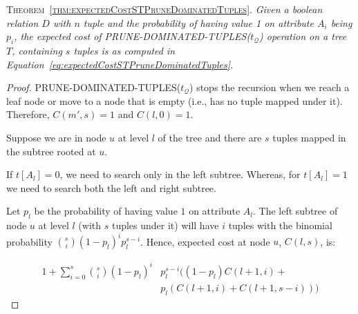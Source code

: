 \textsc{Theorem~\ref{thm:expectedCostSTPruneDominatedTuples}.} {\em
Given a boolean relation $D$ with $n$ tuple and the probability of having value 1 on attribute $A_i$ being $p_i$, the expected cost of PRUNE-DOMINATED-TUPLES($t_\mathcal{Q}$) operation on a tree $T$, containing $s$ tuples is as computed in Equation~\ref{eq:expectedCostSTPruneDominatedTuples}.
}


\begin{proof}
PRUNE-DOMINATED-TUPLES($t_\mathcal{Q}$) stops the recursion when we reach a leaf node or move to a node that is empty (i.e., has no tuple mapped under it). Therefore, $C(m', s) = 1$ and $C(l, 0) = 1$.

Suppose we are in node $u$ at level $l$ of the tree and there are $s$ tuples mapped in the subtree rooted at $u$. 

If $t[A_l] = 0$, we need to search only in the left subtree. Whereas, for $t[A_l] = 1$ we need to search both the left and right subtree.

Let $p_l$ be the probability of having value $1$ on attribute $A_l$. The left subtree of node $u$ at level $l$ (with $s$ tuples under it) will have $i$ tuples with the binomial probability ${s \choose i} (1-p_l)^i p_l^{s-i}$. Hence, expected cost at node $u$, $C(l, s)$, is:

\begin{align}
\nonumber
1 + \sum_{i=0}^s {s \choose i}(1-p_l)^i & p_l^{s-i} ( (1 - p_l)C(l+1, i) +\\
                                & p_l (C(l+1, i) + C(l+1, s-i) ) )
\end{align}
\end{proof}

